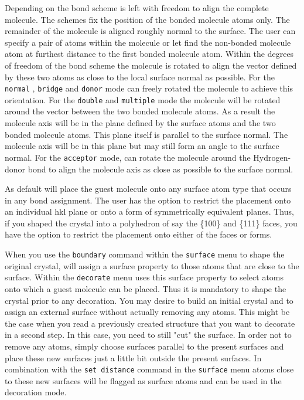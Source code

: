 Depending on the bond scheme \Discus is left with freedom to align the complete
molecule. The schemes fix the position of the bonded molecule atoms only.
The remainder of the molecule is aligned roughly normal to the surface.
The user can specify a pair of atoms within the molecule or let \Discus
find the non-bonded molecule atom at furthest distance to the first
bonded molecule atom. Within the degrees of freedom of the bond scheme
the molecule is rotated to align the vector defined by these two atoms 
as close to the local surface normal as possible. For the {\tt normal}
, {\tt bridge} and {\tt donor} mode \Discus can freely rotated the 
molecule to achieve 
this orientation. For the {\tt double} and {\tt multiple} mode the 
molecule will be rotated around the vector between the two bonded molecule
atoms. As a result the molecule axis will be in the plane defined by the
surface atoms and the two bonded molecule atoms. This plane itself
is parallel to the surface normal. The molecule axis will be in this
plane but may still form an angle to the surface normal. For the
{\tt acceptor} mode, \Discus can rotate the molecule around the
Hydrogen-donor bond to align the molecule axis as close as possible to
the surface normal.

As default \Discus will place the guest molecule onto any surface atom type 
that occurs in any bond assignment. The user has the option to restrict
the placement onto an individual hkl plane or onto a form of symmetrically
equivalent planes. Thus, if you shaped the crystal into a polyhedron of
say the \{100\} and \{111\} faces, you have the option to restrict the 
placement onto either of the faces or forms.

When you use the {\tt boundary} command within the {\tt surface} menu to
shape the original crystal, \Discus will assign a surface property to 
those atoms that are close to the surface. Within the {\tt decorate} menu
\Discus uses this surface property to select atoms onto which a guest 
molecule can be placed. Thus it is mandatory to shape the crystal prior 
to any decoration. You may desire to build an initial crystal and to assign 
an external surface without actually removing any atoms. This might be
the case when you read a previously created structure that you want 
to decorate in a second step. In this case, you need to still "cut" 
the surface. In order not to remove any atoms, simply choose surfaces
parallel to the present surfaces and place these new surfaces just a little
bit outside the present surfaces. In combination with the 
{\tt set distance} command in the {\tt surface} menu atoms close to these
new surfaces will be flagged as surface atoms and can be used in the
decoration mode.

